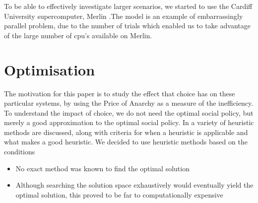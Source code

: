 \documentclass[12pt]{article}
\begin{document}
 To be able to effectively investigate larger scenarios, we started to use the Cardiff University supercomputer, Merlin \cite{web002}.The model is an example of embarrassingly parallel problem\cite{cite005}, due to the number of trials which enabled us to take advantage of the large number of cpu's available on Merlin\cite{cite007}.



%



\section{Optimisation}

	The motivation for this paper is to study the effect that choice has on these particular systems, by using the Price of Anarchy as a measure of the inefficiency. To understand the impact of choice, we do not need the optimal social policy, but merely a good approximation to the optimal social policy. In \cite{cite023} a variety of heuristic methods are discussed, along with criteria for when a heuristic is applicable and what makes a good heuristic. We decided to use heuristic methods based on the conditions
    \begin{itemize}
    	\item{No exact method was known to find the optimal solution}
        \item{Although searching the solution space exhaustively would eventually yield the optimal solution, this proved to be far to computationally expensive }
    \end{itemize}
\end{document}
